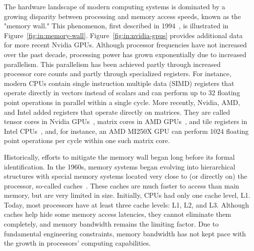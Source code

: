 The hardware landscape of modern computing systems is dominated by a growing disparity between processing and memory access speeds, known as the "memory wall." This phenomenon, first described in 1994~\cite{Wulf_1995_Hitting_the_mem}, is illustrated in Figure~\ref{fig:in:memory-wall}. Figure~\ref{fig:in:nvidia-gpus} provides additional data for more recent Nvidia GPUs. Although processor frequencies have not increased over the past decade, processing power has grown exponentially due to increased parallelism. This parallelism has been achieved partly through increased processor core counts and partly through specialized registers. For instance, modern CPUs contain single instruction multiple data (SIMD) registers that operate directly in vectors instead of scalars and can perform up to 32 floating point operations in parallel within a single cycle. More recently, Nvidia, AMD, and Intel added registers that operate directly on matrices. They are called tensor cores in Nvidia GPUs~\cite{NvidiaTensorCores}, matrix cores in AMD GPUs~, and tile registers in Intel CPUs~\cite{Intel_AMX}, and, for instance, an AMD MI250X GPU can perform 1024 floating point operations per cycle within one such matrix core.

Historically, efforts to mitigate the memory wall began long before its formal identification. In the 1960s, memory systems began evolving into hierarchical structures with special memory systems located very close to (or directly on) the processor, so-called caches~\cite{Liptay_1968_Structural_aspe}. These caches are much faster to access than main memory, but are very limited in size. Initially, CPUs had only one cache level, L1. Today, most processors have at least three cache levels: L1, L2, and L3. Although caches help hide some memory access latencies, they cannot eliminate them completely, and memory bandwidth remains the limiting factor. Due to fundamental engineering constraints, memory bandwidth has not kept pace with the growth in processors' computing capabilities. 

